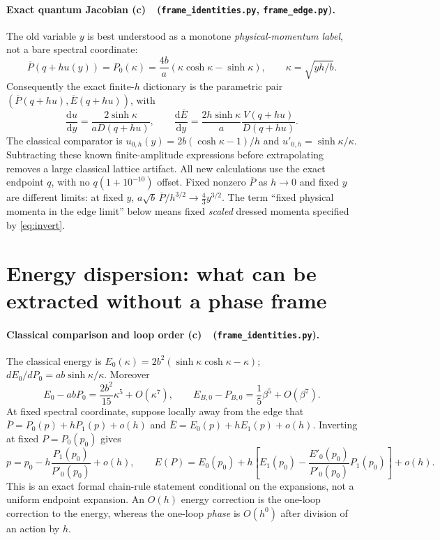 \documentclass[11pt,a4paper]{article}
\newcommand{\Lc}{\textbf{(c)}\ }
\newcommand{\dd}{\mathrm d}
\newcommand{\id}{\texttt{frame\_\allowbreak identities.py}}
\newcommand{\ed}{\texttt{frame\_\allowbreak edge.py}}
\begin{document}
\paragraph{Exact quantum Jacobian \Lc\ (\id, \ed).}
The old variable $y$ is best understood as a monotone \emph{physical-momentum
label}, not a bare spectral coordinate:
\begin{equation}
 \overline P(q+hu(y))=P_0(\kappa)
 =\frac{4b}{a}(\kappa\cosh\kappa-\sinh\kappa),\qquad
 \kappa=\sqrt{yh/b}.
 \label{eq:invert}
\end{equation}
Consequently the exact finite-$h$ dictionary is the parametric pair
$(\overline P(q+hu),\overline E(q+hu))$, with
\begin{equation}
 \boxed{\frac{\dd u}{\dd y}=\frac{2\sinh\kappa}{aD(q+hu)},\qquad
 \frac{\dd\overline E}{\dd y}
 =\frac{2h\sinh\kappa}{a}\frac{V(q+hu)}{D(q+hu)}.}
 \label{eq:jac}
\end{equation}
The classical comparator is $u_{0,h}(y)=2b(\cosh\kappa-1)/h$ and
$u'_{0,h}=\sinh\kappa/\kappa$. Subtracting these known finite-amplitude
expressions before extrapolating removes a large classical lattice artifact.
All new calculations use the exact endpoint $q$, with no $q(1+10^{-10})$
offset. Fixed nonzero $\overline P$ as $h\to0$ and fixed $y$ are different
limits: at fixed $y$, $a\sqrt b\,\overline P/h^{3/2}\to\frac43 y^{3/2}$.
The term ``fixed physical momenta in the edge limit'' below means fixed
\emph{scaled} dressed momenta specified by \eqref{eq:invert}.

\section{Energy dispersion: what can be extracted without a phase frame}
\paragraph{Classical comparison and loop order \Lc\ (\id).}
The classical energy is $E_0(\kappa)=2b^2(\sinh\kappa\cosh\kappa-\kappa)$;
$dE_0/dP_0=ab\sinh\kappa/\kappa$. Moreover
\begin{equation}
 E_0-abP_0=\frac{2b^2}{15}\kappa^5+O(\kappa^7),\qquad
 E_{B,0}-P_{B,0}=\frac15\beta^5+O(\beta^7).
 \label{eq:dispcl}
\end{equation}
At fixed spectral coordinate, suppose locally away from the edge that
$\overline P=P_0(p)+hP_1(p)+o(h)$ and
$\overline E=E_0(p)+hE_1(p)+o(h)$. Inverting at fixed $P=P_0(p_0)$ gives
\begin{equation}
 p=p_0-h\frac{P_1(p_0)}{P'_0(p_0)}+o(h),\qquad
 E(P)=E_0(p_0)+h\left[E_1(p_0)-\frac{E'_0(p_0)}{P'_0(p_0)}P_1(p_0)\right]+o(h).
 \label{eq:fixedP}
\end{equation}
This is an exact formal chain-rule statement conditional on the expansions,
not a uniform endpoint expansion. An $O(h)$ energy correction is the
one-loop correction to the energy, whereas the one-loop \emph{phase} is
$O(h^0)$ after division of an action by $h$.
\end{document}

